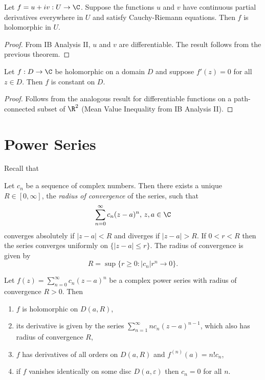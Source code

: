 \documentclass[a4paper]{article}
\begin{document}
\begin{corollary}
  Let \(f = u + iv: U \to \C\). Suppose the functions \(u\) and \(v\) have continuous partial derivatives everywhere in \(U\) and satisfy Cauchy-Riemann equations. Then \(f\) is holomorphic in \(U\).
\end{corollary}

\begin{proof}
  From IB Analysis II, \(u\) and \(v\) are differentiable. The result follows from the previous theorem.
\end{proof}

\begin{corollary}
  Let \(f: D \to \C\) be holomorphic on a domain \(D\) and suppose \(f'(z) = 0\) for all \(z \in D\). Then \(f\) is constant on \(D\).
\end{corollary}

\begin{proof}
  Follows from the analogous result for differentiable functions on a path-connected subset of \(\R^2\) (Mean Value Inequality from IB Analysis II).
\end{proof}

\section{Power Series}

Recall that

\begin{theorem}
  Let \(c_n\) be a sequence of complex numbers. Then there exists a unique \(R \in [0, \infty]\), the \emph{radius of convergence} of the series, such that
  \[
    \sum_{n = 0}^\infty c_n(z - a)^n,\, z, a \in \C
  \]
  converges absolutely if \(|z - a| < R\) and diverges if \(|z - a| > R\). If \(0 < r < R\) then the series converges uniformly on \(\{|z - a| \leq r\}\). The radius of convergence is given by
  \[
    R = \sup\{r \geq 0: |c_n|r^n \to 0\}.
  \]
\end{theorem}

\begin{theorem}
  Let \(f(z) = \sum_{n = 0}^\infty c_n(z - a)^n\) be a complex power series with radius of convergence \(R > 0\). Then
  \begin{enumerate}
  \item \(f\) is holomorphic on \(D(a, R)\),
  \item its derivative is given by the series \(\sum_{n = 1}^\infty nc_n(z - a)^{n - 1}\), which also has radius of convergence \(R\),
  \item \(f\) has derivatives of all orders on \(D(a, R)\) and \(f^{(n)}(a) = n!c_n\),
  \item if \(f\) vanishes identically on some disc \(D(a, \varepsilon)\) then \(c_n = 0\) for all \(n\).
  \end{enumerate}
\end{theorem}
\end{document}
